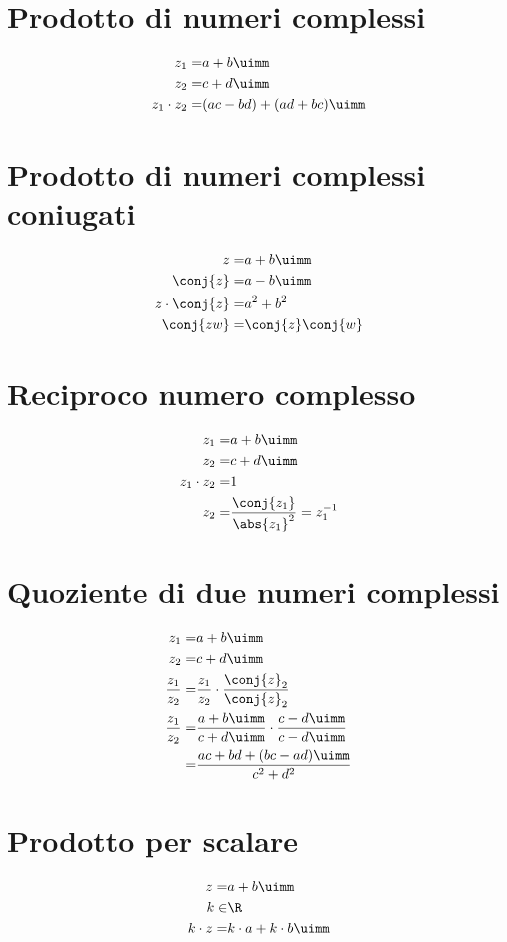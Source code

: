 \section{Prodotto di numeri complessi}
\begin{align*}
z_1=&a+b\uimm\\
z_2=&c+d\uimm\\
z_1\cdot z_2=&(ac-bd)+(ad+bc)\uimm
\end{align*}
\section{Prodotto di numeri complessi coniugati}
\begin{align*}
z=&a+b\uimm\\
\conj{z}=&a-b\uimm\\
z\cdot\conj{z}=&a^2+b^2\\
\conj{zw}=&\conj{z}\conj{w}
\end{align*}
\section{Reciproco numero complesso }
\begin{align*}
z_1=&a+b\uimm\\
z_2=&c+d\uimm\\
z_1\cdot z_2=&1\\
z_2=&\dfrac{\conj{z_1}}{\abs{z_1}^2}=z^{-1}_1\\
\end{align*}
\section{Quoziente di due numeri complessi}
\begin{align*}
z_1=&a+b\uimm\\
z_2=&c+d\uimm\\
\dfrac{z_1}{z_2}=&\dfrac{z_1}{z_2}\cdot\dfrac{\conj{z}_2}{\conj{z}_2}\\
\dfrac{z_1}{z_2}=&\dfrac{a+b\uimm}{c+d\uimm}\cdot\dfrac{c-d\uimm}{c-d\uimm}\\
=&\dfrac{ac+bd+(bc-ad)\uimm}{c^2+d^2}
\end{align*}
\section{Prodotto per scalare}
\begin{align*}
z=&a+b\uimm\\
k\in&\R\\
k\cdot z=&k\cdot a+k\cdot b\uimm\\
\end{align*}
